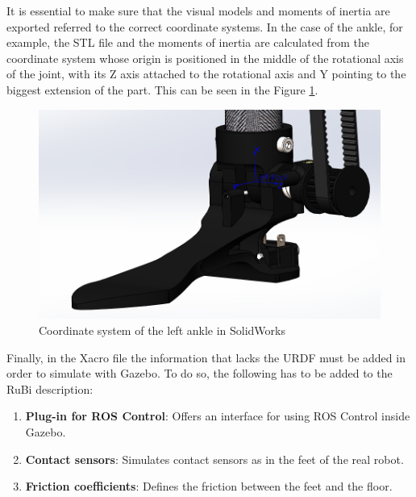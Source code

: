 It is essential to make sure that the visual models and moments of inertia are exported referred to the correct coordinate systems.
In the case of the ankle, for example, the STL file and the moments of inertia are calculated from the coordinate system whose origin is positioned in the middle of the rotational axis of the joint, with its Z axis attached to the rotational axis and Y pointing to the biggest extension of the part.
This can be seen in the Figure \ref{fig:solidworks_ankle_coodinate_system}.

\begin{figure}[ht!]
  \centering
  \includegraphics[width=0.75\linewidth]{figures/solidworks_ankle_coordinate_system}
  \caption{Coordinate system of the left ankle in SolidWorks}
  \label{fig:solidworks_ankle_coodinate_system}
\end{figure}

Finally, in the Xacro file the information that lacks the URDF must be added in order to simulate with Gazebo.
To do so, the following has to be added to the RuBi description:
\begin{enumerate}
  \item \textbf{Plug-in for ROS Control}: Offers an interface for using ROS Control inside Gazebo.
  \item \textbf{Contact sensors}: Simulates contact sensors as in the feet of the real robot.
  \item \textbf{Friction coefficients}: Defines the friction between the feet and the floor.
\end{enumerate}

